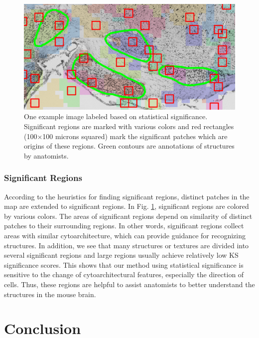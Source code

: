 \documentclass[runningheads]{llncs}
\begin{document}
\begin{figure}
\includegraphics[width=\textwidth]{hsv1_part.jpg}
\caption{ One example image labeled based on statistical significance. Significant regions are marked with various colors and red rectangles (100$\times$100 microns squared) mark the significant patches which are origins of these regions. Green contours are annotations of structures by anatomists.}
\label{hsv}
\end{figure}


\subsubsection{Significant Regions}

According to the heuristics for finding significant regions, distinct patches in the map are extended to significant regions. In Fig. \ref{hsv}, significant regions are colored by various colors. The areas of significant regions depend on similarity of distinct patches to their surrounding regions. In other words, significant regions collect areas with similar cytoarchitecture, which can provide guidance for recognizing structures. In addition, we see that many structures or textures are divided into several significant regions and large regions usually achieve relatively low KS significance scores. This shows that our method using statistical significance is sensitive to the change of cytoarchitectural features, especially the direction of cells. Thus, these regions are helpful to assist anatomists to better understand the structures in the mouse brain.



\section{Conclusion}
\end{document}

